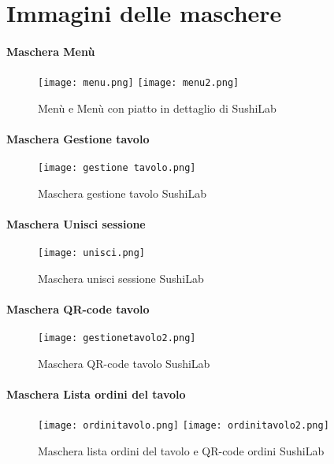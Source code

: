 \label{cap:appendice c}
\chapter{Immagini delle maschere}
\subsubsection{Maschera Menù}
\begin{figure}[H]
    \centering
    \texttt{[image: menu.png]}
    \texttt{[image: menu2.png]}
    \caption{Menù e Menù con piatto in dettaglio di SushiLab}
\end{figure}

\subsubsection{Maschera Gestione tavolo}
\begin{figure}[H]
    \centering
    \texttt{[image: gestione tavolo.png]}
    \caption{Maschera gestione tavolo SushiLab}
\end{figure}

\subsubsection{Maschera Unisci sessione}
\begin{figure}[H]
    \centering
    \texttt{[image: unisci.png]}
    \caption{Maschera unisci sessione SushiLab}
\end{figure}
\subsubsection{Maschera QR-code tavolo}
\begin{figure}[H]
    \centering
    \texttt{[image: gestionetavolo2.png]}
    \caption{Maschera QR-code tavolo SushiLab}
\end{figure}


\subsubsection{Maschera Lista ordini del tavolo}
\begin{figure}[H]
    \centering
    \texttt{[image: ordinitavolo.png]}
    \texttt{[image: ordinitavolo2.png]}
    \caption{Maschera lista ordini del tavolo e QR-code ordini SushiLab}
\end{figure}


